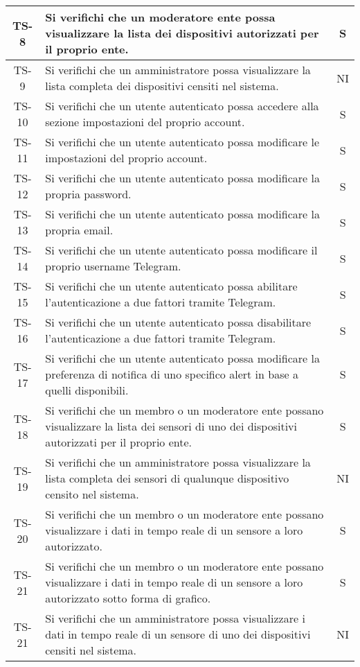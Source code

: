 \begin{center}
\begin{longtable}{|c|p{10cm}|c|}
			 TS-8 & Si verifichi che un moderatore ente possa visualizzare la lista dei dispositivi autorizzati per il proprio ente. & S \\
			 \hline
			 TS-9 & Si verifichi che un amministratore possa visualizzare la lista completa dei dispositivi censiti nel sistema. & NI \\
			 \hline
			 TS-10 & Si verifichi che un utente autenticato possa accedere alla sezione impostazioni del proprio account. & S \\
			 \hline
			 TS-11 & Si verifichi che un utente autenticato possa modificare le impostazioni del proprio account. & S \\
			 \hline
			 TS-12 & Si verifichi che un utente autenticato possa modificare la propria password. & S \\
			 \hline
			 TS-13 & Si verifichi che un utente autenticato possa modificare la propria email. & S \\
			 \hline
			 TS-14 & Si verifichi che un utente autenticato possa modificare il proprio username Telegram. & S \\
			 \hline
			 TS-15 & Si verifichi che un utente autenticato possa abilitare l'autenticazione a due fattori tramite Telegram. & S \\
			 \hline
			 TS-16 & Si verifichi che un utente autenticato possa disabilitare l'autenticazione a due fattori tramite Telegram. & S \\
			 \hline
			 TS-17 & Si verifichi che un utente autenticato possa modificare la preferenza di notifica di uno specifico alert in base a quelli disponibili. & S \\
			 \hline
			 TS-18 & Si verifichi che un membro o un moderatore ente possano visualizzare la lista dei sensori di uno dei dispositivi autorizzati per il proprio ente. & S \\
			 \hline
			 TS-19 & Si verifichi che un amministratore possa visualizzare la lista completa dei sensori di qualunque dispositivo censito nel sistema. & NI \\
			 \hline
			 TS-20 & Si verifichi che un membro o un moderatore ente possano visualizzare i dati in tempo reale di un sensore a loro autorizzato. & S \\
			 \hline
			 TS-21 & Si verifichi che un membro o un moderatore ente possano visualizzare i dati in tempo reale di un sensore a loro autorizzato sotto forma di grafico. & S \\
			 \hline
			 TS-21 & Si verifichi che un amministratore possa visualizzare i dati in tempo reale di un sensore di uno dei dispositivi censiti nel sistema. & NI \\

\end{longtable}
\end{center}

